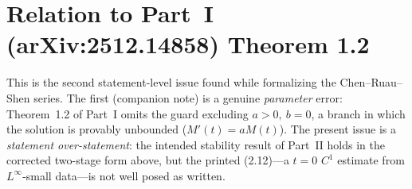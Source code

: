 \documentclass[11pt]{article}
\begin{document}
\section{Relation to Part~I (arXiv:2512.14858) Theorem 1.2}

This is the second statement-level issue found while formalizing the
Chen--Ruau--Shen series.  The first (companion note) is a genuine
\emph{parameter} error: Theorem~1.2 of Part~I omits the guard excluding
$a>0,\ b=0$, a branch in which the solution is provably unbounded
($M'(t)=aM(t)$).  The present issue is a \emph{statement over-statement}: the
intended stability result of Part~II holds in the corrected two-stage form
above, but the printed (2.12)---a $t=0$ $C^{1}$ estimate from $L^{\infty}$-small
data---is not well posed as written.
\end{document}
